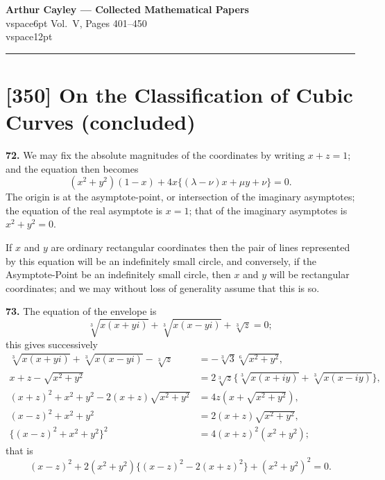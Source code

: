 \documentclass[11pt,a4paper]{article}
\theoremstyle{plain}
\begin{document}
\begin{center}
{\Large\bfseries Arthur Cayley --- Collected Mathematical Papers}\\vspace{6pt}
{\large Vol.~V, Pages 401--450}\\vspace{12pt}
\rule{0.8\textwidth}{0.4pt}
\end{center}

\tableofcontents
\newpage

\section*{[350] On the Classification of Cubic Curves (concluded)}

\setcounter{section}{72}

\noindent\textbf{72.} We may fix the absolute magnitudes of the coordinates by writing $x + z = 1$; and the equation then becomes
\[
(x^2 + y^2)(1-x) + 4x\{(\lambda - \nu)x + \mu y + \nu\} = 0.
\]
The origin is at the asymptote-point, or intersection of the imaginary asymptotes; the equation of the real asymptote is $x = 1$; that of the imaginary asymptotes is $x^2 + y^2 = 0$.

If $x$ and $y$ are ordinary rectangular coordinates then the pair of lines represented by this equation will be an indefinitely small circle, and conversely, if the Asymptote-Point be an indefinitely small circle, then $x$ and $y$ will be rectangular coordinates; and we may without loss of generality assume that this is so.

\noindent\textbf{73.} The equation of the envelope is
\[
\sqrt[3]{x(x+yi)} + \sqrt[3]{x(x-yi)} + \sqrt[3]{z} = 0;
\]
this gives successively
\begin{align*}
\sqrt[3]{x(x+yi)} + \sqrt[3]{x(x-yi)} - \sqrt[3]{z} &= -\sqrt[3]{3}\sqrt[6]{x^2+y^2},\\
x + z - \sqrt{x^2+y^2} &= 2\sqrt[3]{z}\{\sqrt[3]{x(x+iy)} + \sqrt[3]{x(x-iy)}\},\\
(x+z)^2 + x^2 + y^2 - 2(x+z)\sqrt{x^2+y^2} &= 4z(x + \sqrt{x^2+y^2}),\\
(x-z)^2 + x^2 + y^2 &= 2(x+z)\sqrt{x^2+y^2},\\
\{(x-z)^2 + x^2 + y^2\}^2 &= 4(x+z)^2(x^2+y^2);
\end{align*}
that is
\[
(x-z)^2 + 2(x^2+y^2)\{(x-z)^2 - 2(x+z)^2\} + (x^2+y^2)^2 = 0.
\]
\end{document}
